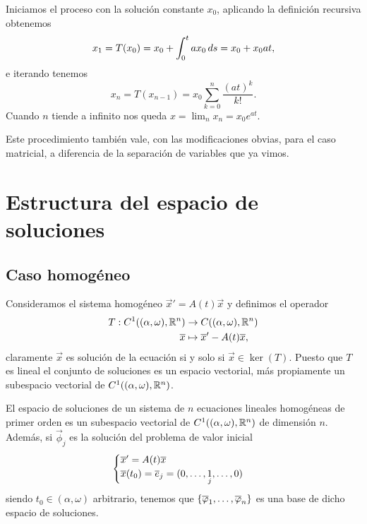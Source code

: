 \documentclass[../ecuaciones_diferenciales.tex]{subfiles}
\begin{document}
\begin{solution}
	Iniciamos el proceso con la solución constante \(x_0\), aplicando la
    definición recursiva obtenemos
	\[x_1 = T(x_0) = x_0 + \int_0^t a x_0 \mathop{d\!} s = x_0 + x_0 a t,\]
	e iterando tenemos
	\[x_n = T(x_{n - 1}) = x_0 \sum_{k = 0}^n \frac{(at)^k}{k!}.\]
	Cuando \(n\) tiende a infinito nos queda
	\(x = \lim_n x_n = x_0 e^{at}\).
\end{solution}

Este procedimiento también vale, con las modificaciones obvias, para el caso
matricial, a diferencia de la separación de variables que ya vimos.

\section{Estructura del espacio de soluciones}

\subsection{Caso homogéneo}

Consideramos el sistema homogéneo \(\vec{x}' = A(t) \vec{x}\) y definimos el
operador
\begin{align*}
	T : C^1((\alpha, \omega), \mathbb{R}^n) & \to C((\alpha, \omega), \mathbb{R}^n) \\
							\overline{x} & \mapsto \overline{x}' - A(t)\overline{x},
\end{align*}
claramente \(\vec{x}\) es solución de la ecuación si y solo si
\(\vec{x} \in \ker(T)\).
Puesto que \(T\) es lineal el conjunto de soluciones es un espacio vectorial,
más propiamente un subespacio vectorial de \(C^1((\alpha, \omega), \mathbb{R}^n)\).

\begin{theorem}
	El espacio de soluciones de un sistema de \(n\) ecuaciones lineales
    homogéneas de primer orden es un subespacio vectorial de
    \(C^1((\alpha, \omega), \mathbb{R}^n)\) de dimensión \(n\). Además, si
    \(\vec{\phi}_j\) es la solución del problema de valor inicial
	\[\begin{cases}
		\overline{x}' = A(t)\overline{x} \\
		\overline{x}(t_0) = \overline{e}_j = (0, \dots, \underset{j}{1}, \dots, 0)\end{cases}\]
    siendo \(t_0 \in (\alpha, \omega)\) arbitrario, tenemos que
    \(\set{\vec{\phi}_1, \dots, \vec{\phi}_n}\) es una base de dicho espacio de
    soluciones.
\end{theorem}
\end{document}
